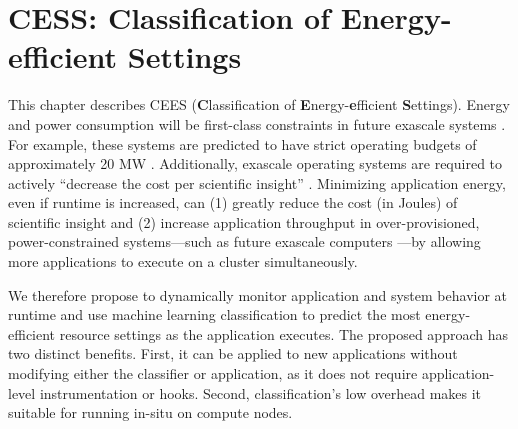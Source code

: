 \chapter{CESS: Classification of Energy-efficient Settings}

This chapter describes CEES (\textbf{C}lassification of \textbf{E}nergy-\textbf{e}fficient \textbf{S}ettings).
Energy and power consumption will be first-class constraints in future exascale systems \cite{exaosr-power}.
For example, these systems are predicted to have strict operating budgets of approximately 20 MW \cite{Exascale20MW}.
Additionally, exascale operating systems are required to actively ``decrease the cost per scientific insight'' \cite{DOEML}.  
Minimizing application energy, even if runtime is increased, can (1) greatly reduce the cost (in Joules) of scientific insight and (2) increase application throughput in over-provisioned, power-constrained systems---such as future exascale computers \cite{Sarood2013,PatkiRMAP}---by allowing more applications to execute on a cluster simultaneously.

We therefore propose to dynamically monitor application and system behavior at runtime and use machine learning classification to predict the most energy-efficient resource settings as the application executes.
The proposed approach has two distinct benefits.
First, it can be applied to new applications without modifying either the classifier or application, as it does not require application-level instrumentation or hooks.
Second, classification's low overhead makes it suitable for running in-situ on compute nodes.






